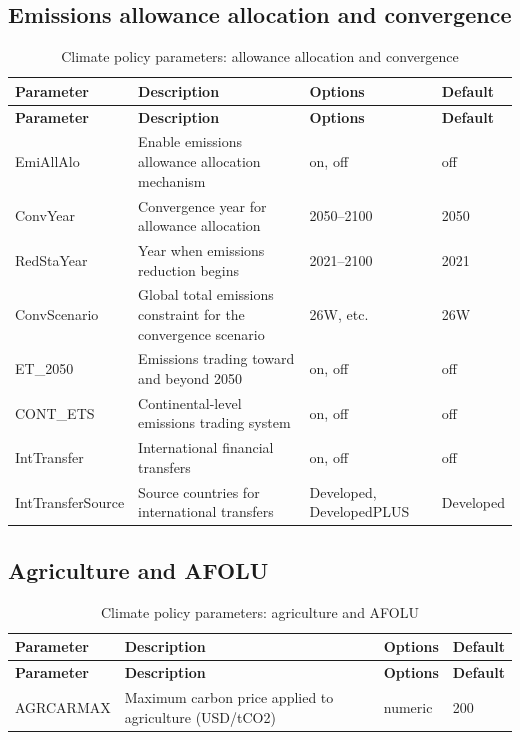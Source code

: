 \documentclass[10pt,a4paper,titlepage,dvipdfmx]{book}
\begin{document}
\subsection{Emissions allowance allocation and convergence}
\begin{longtable}{|p{}|p{}|p{}|p{}|}
\caption{Climate policy parameters: allowance allocation and convergence}\label{tab:sp-clp-alloc}\\
\hline
\textbf{Parameter} & \textbf{Description} & \textbf{Options} & \textbf{Default} \\ \hline
\endfirsthead
\hline
\textbf{Parameter} & \textbf{Description} & \textbf{Options} & \textbf{Default} \\ \hline
\endhead
\hline
\endfoot
EmiAllAlo & Enable emissions allowance allocation mechanism & on, off & off \\ \hline
ConvYear & Convergence year for allowance allocation & 2050--2100 & 2050 \\ \hline
RedStaYear & Year when emissions reduction begins & 2021--2100 & 2021 \\ \hline
ConvScenario & Global total emissions constraint for the convergence scenario & 26W, etc. & 26W \\ \hline
ET\_2050 & Emissions trading toward and beyond 2050 & on, off & off \\ \hline
CONT\_ETS & Continental-level emissions trading system & on, off & off \\ \hline
IntTransfer & International financial transfers & on, off & off \\ \hline
IntTransferSource & Source countries for international transfers & Developed, DevelopedPLUS & Developed \\ \hline
\end{longtable}

\subsection{Agriculture and AFOLU}
\begin{longtable}{|p{}|p{}|p{}|p{}|}
\caption{Climate policy parameters: agriculture and AFOLU}\label{tab:sp-clp-agr}\\
\hline
\textbf{Parameter} & \textbf{Description} & \textbf{Options} & \textbf{Default} \\ \hline
\endfirsthead
\hline
\textbf{Parameter} & \textbf{Description} & \textbf{Options} & \textbf{Default} \\ \hline
\endhead
\hline
\endfoot
AGRCARMAX & Maximum carbon price applied to agriculture (USD/tCO2) & numeric & 200 \\ \hline
\end{longtable}
\end{document}
